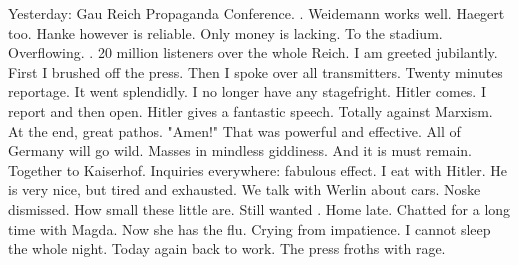 Yesterday: Gau Reich Propaganda Conference. . Weidemann works well. Haegert too. Hanke however is reliable. Only money is lacking. To the stadium. Overflowing. . 20 million listeners over the whole Reich. I am greeted jubilantly. First I brushed off the press. Then I spoke over all transmitters. Twenty minutes reportage.  It went splendidly. I no longer have any stagefright. Hitler comes. I report and then open. Hitler gives a fantastic speech. Totally against Marxism. At the end, great pathos. "Amen!" That was powerful and effective. All of Germany will go wild. Masses in mindless giddiness. And it is must remain. Together to Kaiserhof. Inquiries everywhere: fabulous effect. I eat with Hitler. He is very nice, but tired and exhausted. We talk with Werlin about cars. Noske dismissed. How small these little  are. Still wanted . Home late. Chatted for a long time with Magda. Now she has the flu. Crying from impatience. I cannot sleep the whole night. Today again back to work. The press froths with rage. 